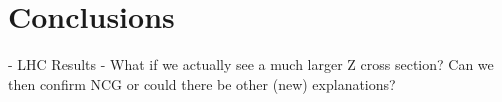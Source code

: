 \section{Conclusions}
- LHC Results
- What if we actually see a much larger Z cross section? Can we then confirm NCG or could there be other (new) explanations?